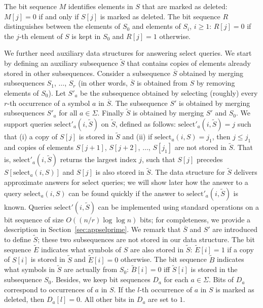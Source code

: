 \documentclass[11pt]{article}\usepackage{fullpage}
\def\idrm#1{\ensuremath{\mathrm{#1}}}
\newcommand{\tS}{{\tilde S}}
\newcommand{\tB}{{\tilde B}}
\newcommand{\tE}{{\tilde E}}
\newcommand{\oS}{{\overline S}}
\newcommand{\sel}{\idrm{select}}
\begin{document}
The bit sequence $M$ identifies elements in $S$ that are marked as deleted: $M[j]=0$ if and only if  $S[j]$ is marked as deleted. 
The bit sequence $R$ distinguishes between the elements of $S_0$ and elements of $S_i$, $i\ge 1$: $R[j]=0$ if the $j$-th element of $S$ is kept in $S_0$ and $R[j]=1$ otherwise. 

We further need  auxiliary data structures for answering 
select queries. We start by defining an auxiliary subsequence $\tS$ that contains copies of elements already stored in other subsequences.  
Consider a subsequence $\oS$ obtained by merging subsequences $S_1$, $\ldots$, $S_r$ (in other words, $\oS$ is obtained from $S$ by removing elements of $S_0$). 
Let $S'_a$ be the subsequence obtained by selecting (roughly) every $r$-th occurrence of a symbol $a$ in $\oS$. 
The subsequence $S'$ is obtained by merging  subsequences $S'_a$ for all $a\in \Sigma$.  
Finally $\tS$ is obtained  by merging $S'$ and $S_0$.  
 We support queries $\sel'_a(i,\tS)$ on $\tS$, defined as follows: $\sel'_a(i,\tS)=j$ such that (i) a copy of $S[j]$ is stored in $\tS$ and (ii) if $\sel_a(i,S)=j_1$, then $j\le j_1$ and copies of elements $S[j+1]$, $S[j+2]$, $\ldots$, $S[j_1]$ are not stored in $\tS$. That is, $\sel'_a(i,\tS)$ returns the largest index  $j$, such that  $S[j]$ precedes $S[\sel_a(i,S)]$ and $S[j]$ is also stored in $\tS$. The data structure for $\tS$ delivers approximate 
answers for $\sel$ queries; we will show later how the answer to a query $\sel_a(i,S)$ can be found quickly if the answer to $\sel'_a(i,\tS)$ is known. Queries $\sel'(i,\tS)$ can be implemented using standard operations on a bit sequence of size $O((n/r)\log\log n)$  bits; for completeness, we provide a description in Section~\ref{sec:appselprime}.  
We remark that $\oS$ and $S'$ are introduced to define $\tS$; these two subsequences are not stored in our data structure. 
The bit sequence $\tE$ indicates what symbols of $S$ are also stored in $\tS$:
$\tE[i]=1$ if a copy of $S[i]$ is stored in $\tS$ and $\tE[i]=0$ otherwise. 
The bit sequence $\tB$ indicates what symbols in $\tS$ are actually from $S_0$: $\tB[i]=0$ iff $\tS[i]$ is stored in the subsequence $S_0$. 
Besides, we keep bit sequences $D_a$ for each $a\in \Sigma$. Bits of $D_a$ correspond to occurrences of $a$ in $S$. 
If the $l$-th occurrence of $a$ in $S$ is marked as deleted, 
then $D_a[l]=0$. All other bits in $D_a$ are set to $1$.
\end{document}

